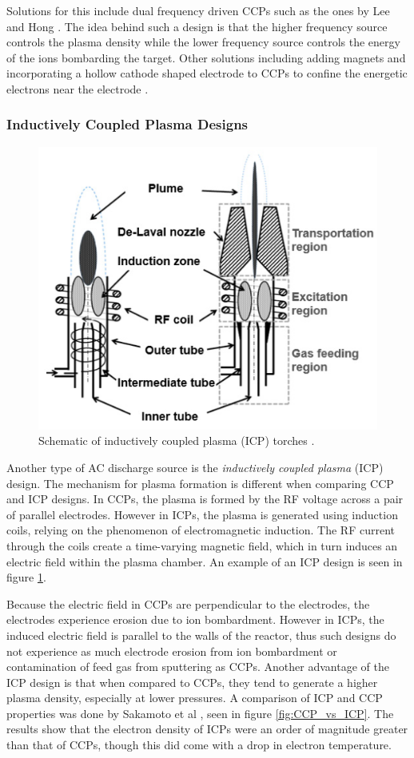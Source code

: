 Solutions for this include dual frequency driven CCPs such as the ones by Lee and Hong \cite{Lee2021}. The idea behind such a design is that the higher frequency source controls the plasma density while the lower frequency source controls the energy of the ions bombarding the target. Other solutions including adding magnets and incorporating a hollow cathode shaped electrode to CCPs to confine the energetic electrons near the electrode \cite{Ohtsu2018}.

\subsubsection{Inductively Coupled Plasma Designs}

\begin{figure}[h!]
	\centering
	\includegraphics[width=0.75\linewidth]{chapter_2/figures/ICP_reactor.png}
	\caption{Schematic of inductively coupled plasma (ICP) torches \cite{Yu2021}.}
	\label{fig:ICP_reactor}
\end{figure} 

Another type of AC discharge source is the \textit{inductively coupled plasma} (ICP) design. The mechanism for plasma formation is different when comparing CCP and ICP designs. In CCPs, the plasma is formed by the RF voltage across a pair of parallel electrodes. However in ICPs, the plasma is generated using induction coils, relying on the phenomenon of electromagnetic induction. The RF current through the coils create a time-varying magnetic field, which in turn induces an electric field within the plasma chamber. An example of an ICP design is seen in figure \ref{fig:ICP_reactor}. 

Because the electric field in CCPs are perpendicular to the electrodes, the electrodes experience erosion due to ion bombardment. However in ICPs, the induced electric field is parallel to the walls of the reactor, thus such designs do not experience as much electrode erosion from ion bombardment or contamination of feed gas from sputtering as CCPs. Another advantage of the ICP design is that when compared to CCPs, they tend to generate a higher plasma density, especially at lower pressures. A comparison of ICP and CCP properties was done by Sakamoto et al \cite{Sakamoto2009ComparisonOP}, seen in figure \ref{fig:CCP_vs_ICP}. The results show that the electron density of ICPs were an order of magnitude greater than that of CCPs, though this did come with a drop in electron temperature. 

